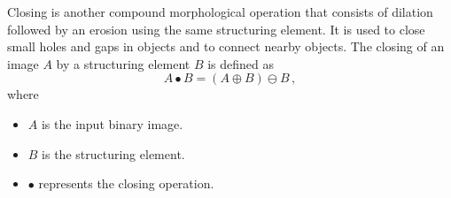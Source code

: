 Closing is another compound morphological operation that consists of dilation followed by an erosion using the same structuring element. It is used to close small holes and gaps in objects and to connect nearby objects. The closing of an image $A$ by a structuring element $B$ is defined as
\begin{equation}
    A \bullet B = (A \oplus B) \ominus B\,,
    \label{eq:closing}
\end{equation}
where
\begin{itemize}
    \item $A$ is the input binary image.
    \item $B$ is the structuring element.
    \item $\bullet$ represents the closing operation.
\end{itemize}

